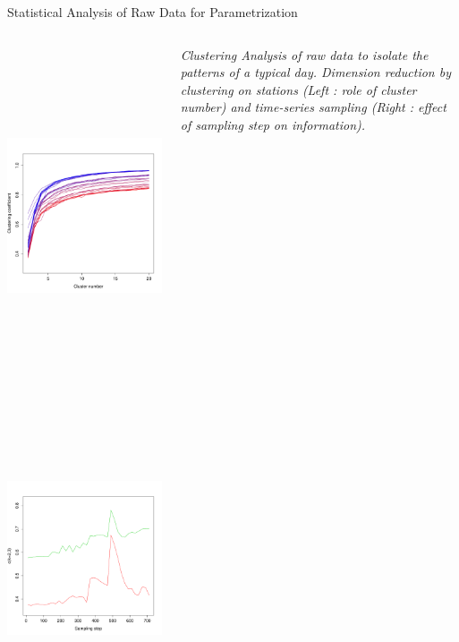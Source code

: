 \documentclass{beamer}
\begin{document}
\begin{frame}{}
\begin{columns}[t]
\begin{column}{.49\textwidth}
\begin{block}{Statistical Analysis of Raw Data for Parametrization}
\begin{columns}[t]
\begin{column}{.95\textwidth}
\begin{justify}
        \begin{columns}[t]
        \begin{column}{.48\textwidth}
        \vspace{0.01cm}
        \hfill
          \includegraphics[width=0.5\columnwidth,height=10cm]{figures/clusterNumber}
           \includegraphics[width=0.5\columnwidth,height=10cm]{figures/infoLoss}
           \hfill\hfill
          \end{column}
          \begin{column}{.48\textwidth}
          \begin{justify}
          \textit{\small Clustering Analysis of raw data to isolate the patterns of a typical day. Dimension reduction by clustering on stations (Left : role of cluster number) and time-series sampling (Right : effect of sampling step on information).}
          \end{justify}
          \end{column}
          \end{columns}


\end{justify}
\end{column}
\end{columns}
\end{block}
\end{column}
\end{columns}
\end{frame}
\end{document}
